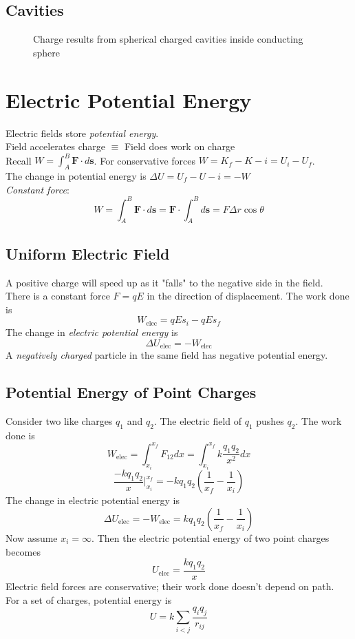 \subsection{Cavities}
\begin{figure}[H]
    \centering
    
    \caption{Charge results from spherical charged cavities inside conducting sphere}
\end{figure}
\section{Electric Potential Energy}
Electric fields store \emph{potential energy}.\\
Field accelerates charge $\equiv$ Field does work on charge\\
Recall $W = \int_A^B\mathbf{F}\cdot d\mathbf{s}$. For conservative forces $W=K_f-K-i=U_i-U_f$.\\
The change in potential energy is $\Delta U=U_f-U-i=-W$\\
\emph{Constant force}:
$$W=\int_A^B\mathbf{F}\cdot d\mathbf{s}=\mathbf{F}\cdot\int_A^Bd\mathbf{s}=F\Delta r\cos\theta$$
\subsection{Uniform Electric Field}
A positive charge will speed up as it "falls" to the negative side in the field.\\
There is a constant force $F=qE$ in the direction of displacement. The work done is
$$W_{\text{elec}}=qEs_i-qEs_f$$
The change in \emph{electric potential energy} is
$$\Delta U_{\text{elec}}=-W_{\text{elec}}$$
A \emph{negatively charged} particle in the same field has negative potential energy.
\subsection{Potential Energy of Point Charges}
Consider two like charges $q_1$ and $q_2$. The electric field of $q_1$ pushes $q_2$. The work done is
$$W_{\text{elec}}=\int_{x_i}^{x_f}F_{12}dx=\int_{x_i}^{x_f}k\frac{q_1q_2}{x^2}dx$$
$$\frac{-kq_1q_2}{x}\vert_{x_i}^{x_f}=-kq_1q_2(\frac{1}{x_f}-\frac{1}{x_i})$$
The change in electric potential energy is
$$\Delta U_{\text{elec}}=-W_{\text{elec}}=kq_1q_2(\frac{1}{x_f}-\frac{1}{x_i})$$
Now assume $x_i=\infty$. Then the electric potential energy of two point charges becomes
$$U_{\text{elec}}=\frac{kq_1q_2}{x}$$
Electric field forces are conservative; their work done doesn't depend on path.\\
For a set of charges, potential energy is
$$U=k\sum_{i<j}\frac{q_iq_j}{r_{ij}}$$
